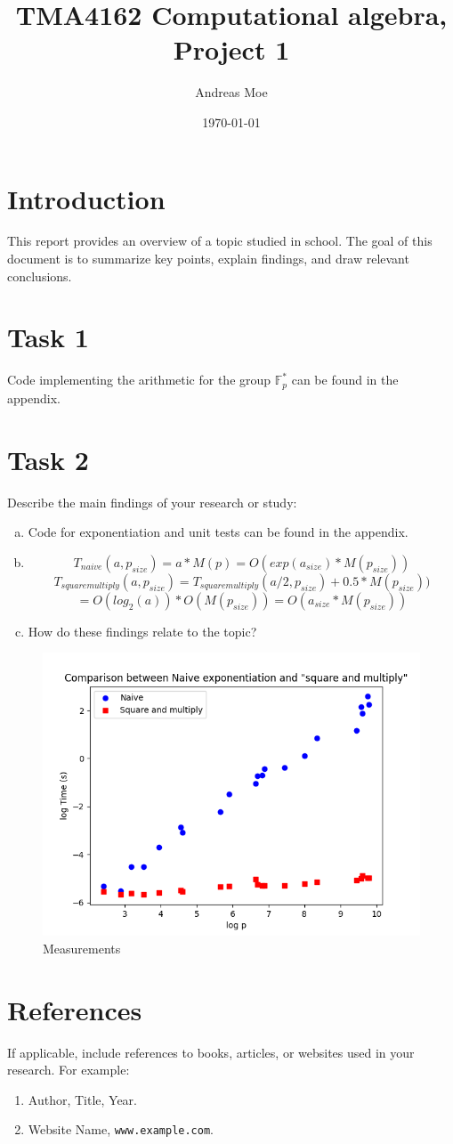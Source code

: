 \documentclass[12pt,a4paper]{article}
\title{TMA4162 Computational algebra, Project 1}
\author{Andreas Moe}
\date{\today}
\begin{document}
\maketitle

\section*{Introduction}
This report provides an overview of a topic studied in school. The goal of this document is to summarize key points, explain findings, and draw relevant conclusions.

\section{Task 1}
Code implementing the arithmetic for the group \(\mathbb{F}_p^*\) can be found in the appendix.

\section{Task 2}
Describe the main findings of your research or study:

\begin{enumerate}[a)]
    \item Code for exponentiation and unit tests can be found in the appendix.
    \item 
\[{T_{naive}}(a, p_{size}) = a*M(p) = O(exp(a_{size})*M(p_{size}))\]
\[{T_{squaremultiply}}(a, p_{size}) = {T_{squaremultiply}}(a/2, p_{size})+0.5*M(p_{size}))\]
\[= O(log_2(a))*O(M(p_{size}))=O(a_{size}*M(p_{size}))\]

    \item How do these findings relate to the topic?
\end{enumerate}


\begin{figure}
    \centering
    \includegraphics[width=0.5\linewidth]{plot_2025-01-24 14-39-00_0.png}
    \caption{Measurements}
    \label{figure1}
\end{figure}


\section*{References}
If applicable, include references to books, articles, or websites used in your research. For example:
\begin{enumerate}
    \item Author, Title, Year.
    \item Website Name, \texttt{www.example.com}.
\end{enumerate}
\end{document}
